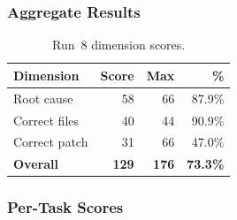 \subsubsection{Aggregate Results}

\begin{table}[h]
\centering
\caption{Run~8 dimension scores.}\label{tab:r8-dim}
\begin{tabular}{lrrr}
\toprule
\textbf{Dimension} & \textbf{Score} & \textbf{Max} & \textbf{\%} \\
\midrule
Root cause         & 58 & 66 & 87.9\% \\
Correct files      & 40 & 44 & 90.9\% \\
Correct patch      & 31 & 66 & 47.0\% \\
\midrule
\textbf{Overall}   & \textbf{129} & \textbf{176} & \textbf{73.3\%} \\
\bottomrule
\end{tabular}
\end{table}

\subsubsection{Per-Task Scores}

